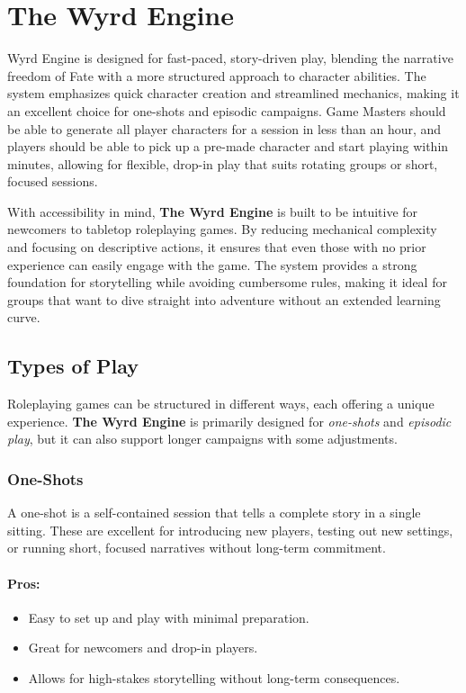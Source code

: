 
\chapter{The Wyrd Engine}

 Wyrd Engine is designed for fast-paced, story-driven play, blending the narrative freedom of Fate with a more structured approach to character abilities. The system emphasizes quick character creation and streamlined mechanics, making it an excellent choice for one-shots and episodic campaigns. Game Masters should be able to generate all player characters for a session in less than an hour, and players should be able to pick up a pre-made character and start playing within minutes, allowing for flexible, drop-in play that suits rotating groups or short, focused sessions.

With accessibility in mind, \textbf{The Wyrd Engine} is built to be intuitive for newcomers to tabletop roleplaying games. By reducing mechanical complexity and focusing on descriptive actions, it ensures that even those with no prior experience can easily engage with the game. The system provides a strong foundation for storytelling while avoiding cumbersome rules, making it ideal for groups that want to dive straight into adventure without an extended learning curve.

\section{Types of Play}

Roleplaying games can be structured in different ways, each offering a unique experience. \textbf{The Wyrd Engine} is primarily designed for \emph{one-shots} and \emph{episodic play}, but it can also support longer campaigns with some adjustments.

\subsection{One-Shots}
A one-shot is a self-contained session that tells a complete story in a single sitting. These are excellent for introducing new players, testing out new settings, or running short, focused narratives without long-term commitment.

\subsubsection{Pros:}
\begin{itemize}
    \item Easy to set up and play with minimal preparation.
    \item Great for newcomers and drop-in players.
    \item Allows for high-stakes storytelling without long-term consequences.
\end{itemize}

